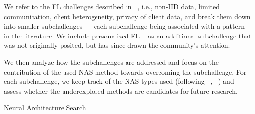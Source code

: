 We refer to the FL challenges described in ~\cite{fl_seminal_2017}, i.e., non-IID data, limited communication, client heterogeneity, privacy of client data, and break them down into smaller subchallenges — each subchallenge being associated with a pattern in the literature. We include personalized FL ~\cite{personalized_fl_2023} as an additional subchallenge that was not originally posited, but has since drawn the community's attention. 

We then analyze how the subchallenges are addressed and focus on the contribution of the used NAS method towards overcoming the subchallenge. For each subchallenge, we keep track of the NAS types used (following ~\cite{nas_1000_papers_2023}, ~\cite{systematic_nas_survey_2024}) and assess whether the underexplored methods are candidates for future research.





Neural Architecture Search  